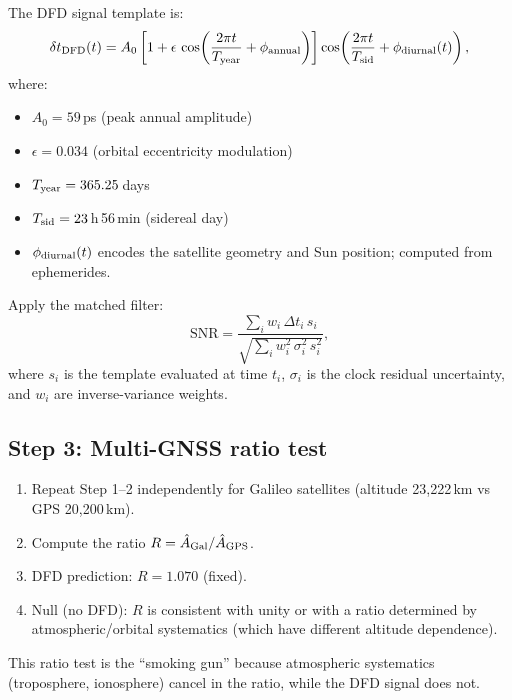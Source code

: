 \documentclass[11pt]{article}
\newcommand{\SNR}{\mathrm{SNR}}
\begin{document}
The DFD signal template is:
\begin{equation}
\delta t_{\rm DFD}(t) = A_0 \left[
  1 + \epsilon\,\cos\!\left(\frac{2\pi t}{T_{\rm year}} + \phi_{\rm annual}\right)
\right]
\cos\!\left(\frac{2\pi t}{T_{\rm sid}} + \phi_{\rm diurnal}(t)\right),
\label{eq:gps_template}
\end{equation}
where:
\begin{itemize}[nosep]
\item $A_0 = 59$\,ps (peak annual amplitude)
\item $\epsilon = 0.034$ (orbital eccentricity modulation)
\item $T_{\rm year} = 365.25$\,days
\item $T_{\rm sid} = 23$\,h\,56\,min (sidereal day)
\item $\phi_{\rm diurnal}(t)$ encodes the satellite geometry and
  Sun position; computed from ephemerides.
\end{itemize}

Apply the matched filter:
\begin{equation}
\SNR = \frac{\sum_i w_i\,\Delta t_i\,s_i}
{\sqrt{\sum_i w_i^2\,\sigma_i^2\,s_i^2}},
\end{equation}
where $s_i$ is the template evaluated at time $t_i$, $\sigma_i$ is
the clock residual uncertainty, and $w_i$ are inverse-variance weights.

\subsection{Step 3: Multi-GNSS ratio test}

\begin{enumerate}[nosep]
\item Repeat Step 1--2 independently for Galileo satellites (altitude
  23,222\,km vs GPS 20,200\,km).
\item Compute the ratio $R = \hat{A}_{\rm Gal}/\hat{A}_{\rm GPS}$.
\item DFD prediction: $R = 1.070$ (fixed).
\item Null (no DFD): $R$ is consistent with unity or with a ratio
  determined by atmospheric/orbital systematics (which have different
  altitude dependence).
\end{enumerate}

This ratio test is the ``smoking gun'' because atmospheric systematics
(troposphere, ionosphere) cancel in the ratio, while the DFD signal
does not.

\end{document}
